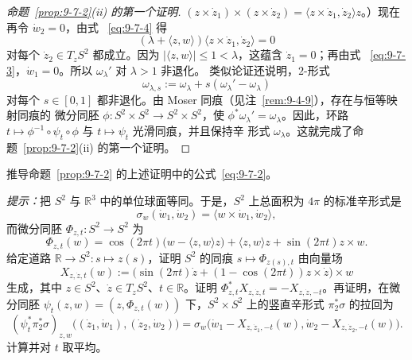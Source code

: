 \begin{proof}[命题~\ref{prop:9-7-2}(ii) 的第一个证明]
$(z\times\dot z_1)\times(z\times\dot z_2)
=\langle z\times\dot z_1,\dot z_2\rangle z$。）现在再令 $\dot w_2=0$，由式
~\eqref{eq:9-7-4} 得
\[
  (\lambda+\langle z,w\rangle)
  \langle z\times\dot z_1,\dot z_2\rangle=0
\]
对每个 $\dot z_2\in T_zS^2$ 都成立。因为
$|\langle z,w\rangle|\le1<\lambda$，这蕴含 $\dot z_1=0$；再由式
~\eqref{eq:9-7-3}，$\dot w_1=0$。所以 $\omega_\lambda'$ 对 $\lambda>1$ 非退化。
类似论证还说明，$2$-形式
\[
  \omega_{\lambda,s}:=\omega_\lambda+s(\omega_\lambda'-\omega_\lambda)
\]
对每个 $s\in[0,1]$ 都非退化。由 Moser 同痕（见注~\ref{rem:9-4-9}），存在与恒等映射同痕的
微分同胚 $\phi:S^2\times S^2\to S^2\times S^2$，使
$\phi^*\omega_\lambda'=\omega_\lambda$。因此，环路
$t\mapsto\phi^{-1}\circ\psi_t\circ\phi$ 与 $t\mapsto\psi_t$ 光滑同痕，并且保持辛
形式 $\omega_\lambda$。这就完成了命题~\ref{prop:9-7-2}(ii) 的第一个证明。
\end{proof}

\begin{exercise}\label{ex:9-7-5}
推导命题~\ref{prop:9-7-2} 的上述证明中的公式~\eqref{eq:9-7-2}。

\emph{提示：}把 $S^2$ 与 $\mathbb R^3$ 中的单位球面等同。于是，$S^2$ 上总面积为
$4\pi$ 的标准辛形式是
\[
  \sigma_w(\dot w_1,\dot w_2)
  =\langle w\times\dot w_1,\dot w_2\rangle,
\]
而微分同胚 $\Phi_{z,t}:S^2\to S^2$ 为
\[
  \Phi_{z,t}(w)
  =\cos(2\pi t)\bigl(w-\langle z,w\rangle z\bigr)
   +\langle z,w\rangle z+\sin(2\pi t)z\times w.
\]
给定道路 $\mathbb R\to S^2:s\mapsto z(s)$，证明 $S^2$ 的同痕
$s\mapsto\Phi_{z(s),t}$ 由向量场
\[
  X_{z,\dot z,t}(w)
  :=\bigl(\sin(2\pi t)\dot z
  +(1-\cos(2\pi t))z\times\dot z\bigr)\times w
\]
生成，其中 $z\in S^2$、$\dot z\in T_zS^2$、$t\in\mathbb R$。证明
$\Phi_{z,t}^*X_{z,\dot z,t}=-X_{z,\dot z,-t}$。再证明，在微分同胚
$\psi_t(z,w)=(z,\Phi_{z,t}(w))$ 下，$S^2\times S^2$ 上的竖直辛形式
$\pi_2^*\sigma$ 的拉回为
\[
  (\psi_t^*\pi_2^*\sigma)_{z,w}
  \bigl((\dot z_1,\dot w_1),(\dot z_2,\dot w_2)\bigr)
  =\sigma_w\bigl(
    \dot w_1-X_{z,\dot z_1,-t}(w),
    \dot w_2-X_{z,\dot z_2,-t}(w)
  \bigr).
\]
计算并对 $t$ 取平均。
\end{exercise}


